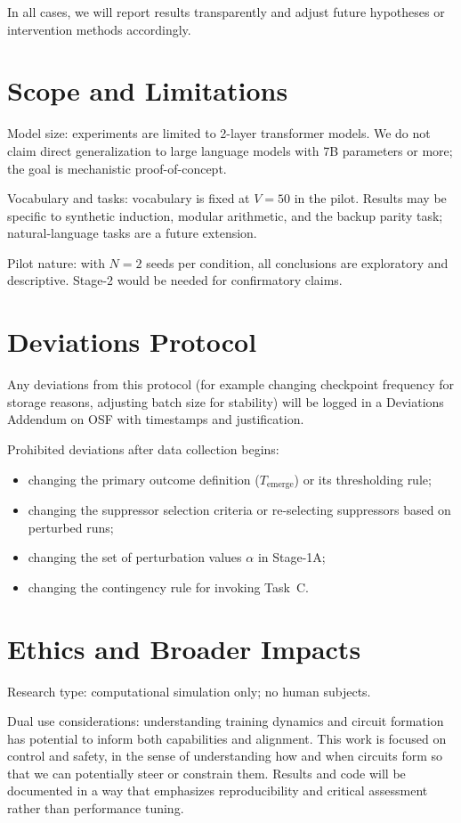 \documentclass[11pt]{article}
\begin{document}
In all cases, we will report results transparently and adjust future hypotheses or intervention methods accordingly.

\section{Scope and Limitations}

Model size: experiments are limited to 2-layer transformer models. We do not claim direct generalization to large language models with 7B parameters or more; the goal is mechanistic proof-of-concept.

Vocabulary and tasks: vocabulary is fixed at $V = 50$ in the pilot. Results may be specific to synthetic induction, modular arithmetic, and the backup parity task; natural-language tasks are a future extension.

Pilot nature: with $N = 2$ seeds per condition, all conclusions are exploratory and descriptive. Stage-2 would be needed for confirmatory claims.

\section{Deviations Protocol}

Any deviations from this protocol (for example changing checkpoint frequency for storage reasons, adjusting batch size for stability) will be logged in a Deviations Addendum on OSF with timestamps and justification.

Prohibited deviations after data collection begins:
\begin{itemize}
  \item changing the primary outcome definition ($T_{\text{emerge}}$) or its thresholding rule;
  \item changing the suppressor selection criteria or re-selecting suppressors based on perturbed runs;
  \item changing the set of perturbation values $\alpha$ in Stage-1A;
  \item changing the contingency rule for invoking Task~C.
\end{itemize}

\section{Ethics and Broader Impacts}

Research type: computational simulation only; no human subjects.

Dual use considerations: understanding training dynamics and circuit formation has potential to inform both capabilities and alignment. This work is focused on control and safety, in the sense of understanding how and when circuits form so that we can potentially steer or constrain them. Results and code will be documented in a way that emphasizes reproducibility and critical assessment rather than performance tuning.
\end{document}
